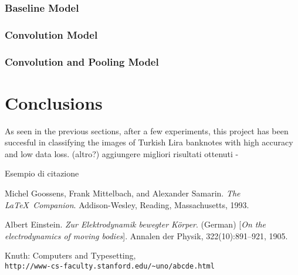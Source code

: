\documentclass[a4paper,12pt]{article}
\begin{document}
\subsubsection{Baseline Model}


\subsubsection{Convolution Model}


\subsubsection{Convolution and Pooling Model}








\newpage
\section{Conclusions}
As seen in the previous sections, after a few experiments, this project has been succesful in classifying the images of Turkish 
Lira banknotes with high accuracy and low data loss.
(altro?) aggiungere migliori risultati ottenuti - 




Esempio di citazione\cite{latexcompanion}

\newpage
{}
\begin{thebibliography}{9}
Michel Goossens, Frank Mittelbach, and Alexander Samarin. 
\textit{The \LaTeX\ Companion}. 
Addison-Wesley, Reading, Massachusetts, 1993.

Albert Einstein. 
\textit{Zur Elektrodynamik bewegter K{\"o}rper}. (German) 
[\textit{On the electrodynamics of moving bodies}]. 
Annalen der Physik, 322(10):891–921, 1905.

Knuth: Computers and Typesetting,
\\\texttt{http://www-cs-faculty.stanford.edu/\~{}uno/abcde.html}
\end{thebibliography}
\end{document}
